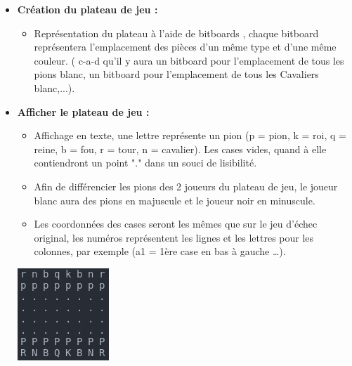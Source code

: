 \documentclass{article}
\begin{document}
\begin{itemize}

\subsection{Liste des besoins fonctionnels}
\medskip

    \item \textbf{Création du plateau de jeu : }
    \medskip
    \begin{itemize}
        \item Représentation du plateau à l'aide de bitboards \cite{Bitboards}, chaque bitboard représentera l'emplacement des pièces d'un même type et d'une même couleur. ( c-a-d qu'il y aura un bitboard pour l'emplacement de tous les pions blanc, un bitboard pour l'emplacement de tous les Cavaliers blanc,...).
    \end{itemize}
    \medskip
    \item \textbf{Afficher le plateau de jeu : }
    \medskip
    \begin{itemize}
        \item Affichage en texte, une lettre représente un pion (p = pion, k = roi, q = reine,
        b = fou, r = tour, n = cavalier).
        Les cases vides, quand à elle contiendront un point "." dans un souci de lisibilité.
        \item Afin de différencier les pions des 2 joueurs du plateau de jeu, le joueur blanc aura des pions en majuscule et le joueur noir en minuscule.
        \item Les coordonnées des cases seront les mêmes que sur le jeu d'échec original, les numéros représentent les lignes et les lettres pour les colonnes, par exemple (a1 = 1ère case en bas à gauche \dots).
    \end{itemize}
    \centerline{\includegraphics[scale = 0.5]{img/echecs_title.png}}

\end{itemize}
\end{document}
